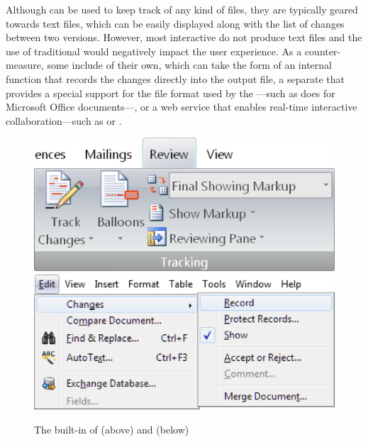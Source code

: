 \documentclass[
  a5paper,10pt,           %
  dvipsnames              %
]{book}
\begin{document}
\begin{figure}
  
\end{figure}

\begin{figure}
  \vspace*{-1mm} %
  
  \vspace*{4in} %
\end{figure}

Although  can be used to keep track of any kind of files, they are
typically geared towards text files, which can be easily displayed along with
the list of changes between two versions. However, most interactive 
do not produce text files and the use of traditional  would
negatively impact the user experience. As a counter-measure, some 
include  of their own, which can take the form of an internal
function that records the changes directly into the output file, a separate
 that provides a special support for the file format used by the
---such as  does for Microsoft Office
documents---, or a web service that enables real-time interactive
collaboration---such as  or .

\begin{figure}
  \includegraphics[width=\textwidth]{examples/01/word.png}\nextimage
  \includegraphics[width=\textwidth]{examples/01/openoffice.png}
  \caption{The built-in  of  (above) and
     (below)}
\end{figure}
\end{document}
